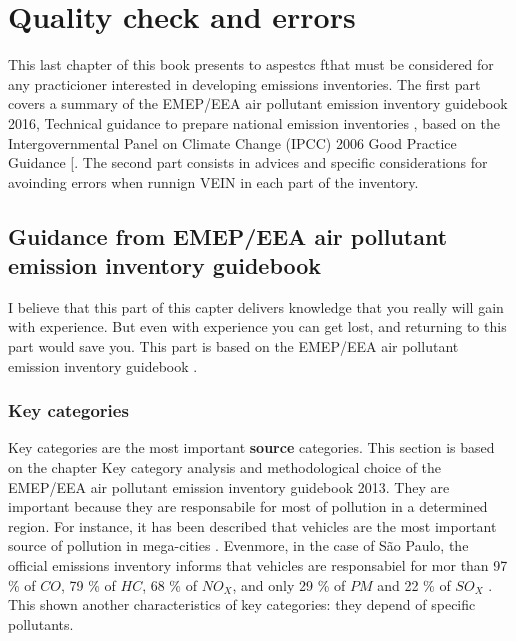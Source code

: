 \documentclass[12pt,graybox,envcountchap,sectrefs]{krantz}
\theoremstyle{definition}
\theoremstyle{definition}
\theoremstyle{definition}
\theoremstyle{remark}
\begin{document}
\chapter{Quality check and errors}\label{check}

This last chapter of this book presents to aspestcs fthat must be
considered for any practicioner interested in developing emissions
inventories. The first part covers a summary of the EMEP/EEA air
pollutant emission inventory guidebook 2016, Technical guidance to
prepare national emission inventories \citep{guia}, based on the
Intergovernmental Panel on Climate Change (IPCC) 2006 Good Practice
Guidance {[}\citet{change20062006}. The second part consists in advices
and specific considerations for avoinding errors when runnign VEIN in
each part of the inventory.

\section{Guidance from EMEP/EEA air pollutant emission inventory
guidebook}\label{guidance-from-emepeea-air-pollutant-emission-inventory-guidebook}

I believe that this part of this capter delivers knowledge that you
really will gain with experience. But even with experience you can get
lost, and returning to this part would save you. This part is based on
the EMEP/EEA air pollutant emission inventory guidebook \citep{guia}.

\subsection{Key categories}\label{key-categories}

Key categories are the most important \textbf{source} categories. This
section is based on the chapter Key category analysis and methodological
choice \citep{guiak} of the EMEP/EEA air pollutant emission inventory
guidebook 2013. They are important because they are responsabile for
most of pollution in a determined region. For instance, it has been
described that vehicles are the most important source of pollution in
mega-cities \citep{molina2004megacities}. Evenmore, in the case of São
Paulo, the official emissions inventory informs that vehicles are
responsabiel for mor than 97 \% of \(CO\), 79 \% of \(HC\), 68 \% of
\(NO_X\), and only 29 \% of \(PM\) and 22 \% of \(SO_X\)
\citep{CETESB2015}. This shown another characteristics of key
categories: they depend of specific pollutants.
\end{document}
